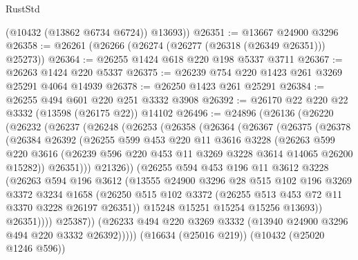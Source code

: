 \begin{lexlean}{RustStd}
\begin{coremodule}
        (@10432 (@13862 @6734 @6724))
        @13693))
@26351 := @13667 @24900 @3296
@26358 := @26261 (@26266 (@26274 (@26277 (@26318 (@26349 @26351))) @25273))
@26364 := @26255 @1424 @618 @220 @198 @5337 @3711
@26367 := @26263 @1424 @220 @5337
@26375 := @26239 @754 @220 @1423 @261 @3269 @25291 @4064 @14939
@26378 := @26250 @1423 @261 @25291
@26384 := @26255 @494 @601 @220 @251 @3332 @3908
@26392 := @26170 @22 @220 @22 @3332 (@13598 (@26175 @22)) @14102
@26496 := @24896
    (@26136
      (@26220
        (@26232
          (@26237
            (@26248
              (@26253
                (@26358
                  (@26364
                    (@26367
                      (@26375
                        (@26378
                          (@26384
                            @26392
                            (@26255
                              @599
                              @453
                              @220
                              @11
                              @3616
                              @3228
                              (@26263
                                @599
                                @220
                                @3616
                                (@26239 @596 @220 @453 @11 @3269 @3228 @3614 @14065 @26200 @15282))
                              @26351)))
                        @21326))
                    (@26255
                      @594
                      @453
                      @196
                      @11
                      @3612
                      @3228
                      (@26263
                        @594
                        @196
                        @3612
                        (@13555
                          @24900
                          @3296
                          @28
                          @515
                          @102
                          @196
                          @3269
                          @3372
                          @3234
                          @1658
                          (@26250
                            @515
                            @102
                            @3372
                            (@26255 @513 @453 @72 @11 @3370 @3228 @26197 @26351))
                          @15248
                          @15251
                          @15254
                          @15256
                          @13693))
                      @26351))))
              @25387))
          (@26233 @494 @220 @3269 @3332 (@13940 @24900 @3296 @494 @220 @3332 @26392)))))
    (@16634 (@25016 @219))
    (@10432 (@25020 @1246 @596))

\end{coremodule}
\end{lexlean}
